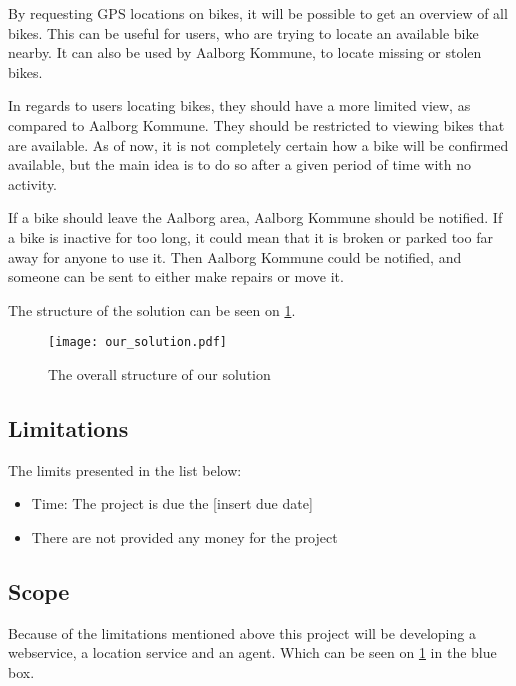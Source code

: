 By requesting GPS locations on bikes, it will be possible to get an overview of all bikes.
This can be useful for users, who are trying to locate an available bike nearby.
It can also be used by Aalborg Kommune, to locate missing or stolen bikes.

In regards to users locating bikes, they should have a more limited view, as compared to Aalborg Kommune.
They should be restricted to viewing bikes that are available.
As of now, it is not completely certain how a bike will be confirmed available, but the main idea is to do so after a given period of time with no activity.

If a bike should leave the Aalborg area, Aalborg Kommune should be notified.
If a bike is inactive for too long, it could mean that it is broken or parked too far away for anyone to use it.
Then Aalborg Kommune could be notified, and someone can be sent to either make repairs or move it.

The structure of the solution can be seen on \cref{fig:solution_structure}.

\begin{figure}
\texttt{[image: our\_solution.pdf]}
\caption{The overall structure of our solution}
\label{fig:solution_structure}
\end{figure}

\subsection{Limitations}
The limits presented in the list below:
\begin{itemize}
\item Time: The project is due the [insert due date]
\item There are not provided any money for the project
\end{itemize}

\subsection{Scope}
Because of the limitations mentioned above this project will be developing a webservice, a location service and an agent.
Which can be seen on \cref{fig:solution_structure} in the blue box.
